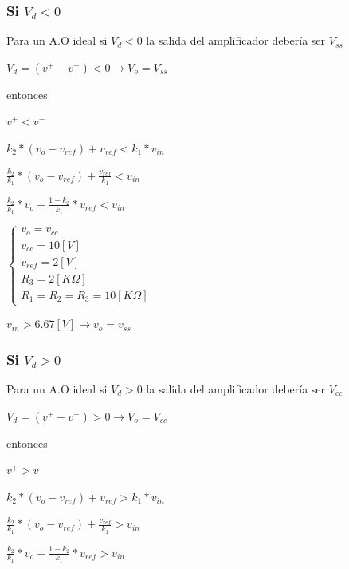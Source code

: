 \subsubsection{Si $V_d<0$}
Para un A.O ideal si $V_d<0$ la salida del amplificador debería ser $V_{ss}$
\begin{center}
	
	$V_d = (v^+ - v^-)<0 \rightarrow  V_o = V_{ss}$
\end{center}
entonces
\begin{center}
	$v^+ < v^-$
\end{center}
\begin{center}
	$k_2 * (v_o - v_{ref})+ v_{ref} < k_1 * v_{in}$
\end{center}
\begin{center}
	$\frac{k_2}{k_1} * (v_o- v_{ref}) + \frac{v_{ref}}{k_1} <v_{in}$ 
\end{center}
\begin{center}
	$\frac{k_2}{k_1} * v_o + \frac{1 - k_2}{k_1} * v_{ref} <v_{in}$ 
\end{center}

\begin{center}
	$\left\{\begin{matrix}
	v_o = v_{cc}\\ 
	v_{cc} = 10[V]\\ 
	v_{ref} = 2[V]\\ 
	R_3 = 2[K\Omega]\\ 
	R_1 = R_2 = R_3 = 10[K\Omega]
\end{matrix}\right.$
\end{center}
\begin{center}
	$v_{in} > 6.67[V] \rightarrow v_o = v_{ss}$ 
\end{center}

\subsubsection{Si $V_d>0$}
Para un A.O ideal si $V_d>0$ la salida del amplificador debería ser $V_{cc}$
\begin{center}
	
	$V_d = (v^+ - v^-)>0 \rightarrow  V_o = V_{cc}$
\end{center}
entonces
\begin{center}
	$v^+ > v^-$
\end{center}
\begin{center}
	$k_2 * (v_o - v_{ref})+ v_{ref} > k_1 * v_{in}$
\end{center}
\begin{center}
	$\frac{k_2}{k_1} * (v_o- v_{ref}) + \frac{v_{ref}}{k_1} > v_{in}$ 
\end{center}
\begin{center}
	$\frac{k_2}{k_1} * v_o + \frac{1 - k_2}{k_1} * v_{ref} > v_{in}$ 
\end{center}

